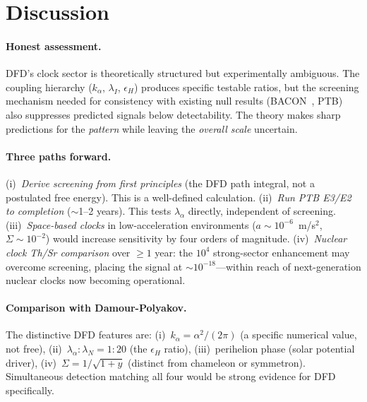 \documentclass[aps,prd,twocolumn,superscriptaddress,floatfix]{revtex4-2}
\newcommand{\kalpha}{k_\alpha}
\newcommand{\epsH}{\epsilon_H}
\begin{document}
\section{Discussion}
\paragraph{Honest assessment.} DFD's clock sector is theoretically
structured but experimentally ambiguous. The coupling hierarchy
($\kalpha$, $\lambda_I$, $\epsH$) produces specific testable
ratios, but the screening mechanism needed for consistency with
existing null results (BACON~\cite{BACON2021}, PTB) also
suppresses predicted signals below detectability. The theory
makes sharp predictions for the \textit{pattern} while leaving
the \textit{overall scale} uncertain.
\paragraph{Three paths forward.}
(i)~\textit{Derive screening from first principles} (the DFD path
integral, not a postulated free energy). This is a well-defined
calculation.
(ii)~\textit{Run PTB E3/E2 to completion} ($\sim$1--2 years).
This tests $\lambda_\alpha$ directly, independent of screening.
(iii)~\textit{Space-based clocks} in low-acceleration environments
($a \sim 10^{-6}$~m/s$^2$, $\Sigma \sim 10^{-2}$) would increase
sensitivity by four orders of magnitude.
(iv)~\textit{Nuclear clock Th/Sr comparison} over $\geq 1$ year:
the $10^4$ strong-sector enhancement may overcome screening,
placing the signal at $\sim\!10^{-18}$---within reach of
next-generation nuclear clocks now becoming operational.
\paragraph{Comparison with Damour-Polyakov.}
The distinctive DFD features are: (i)~$\kalpha = \alpha^2/(2\pi)$
(a specific numerical value, not free), (ii)~$\lambda_\alpha :
\lambda_N = 1 : 20$ (the $\epsH$ ratio), (iii)~perihelion phase
(solar potential driver), (iv)~$\Sigma = 1/\sqrt{1+y}$ (distinct
from chameleon or symmetron). Simultaneous detection matching all
four would be strong evidence for DFD specifically.
\end{document}
